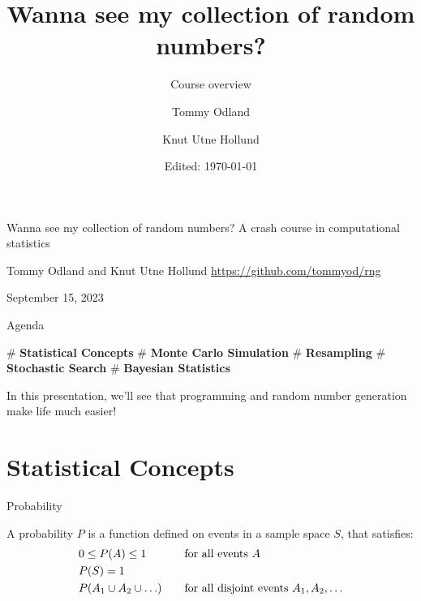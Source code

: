 \documentclass[12pt, aspectratio=149]{beamer}
\institute{Equinor}
\date{Edited: \today}
\author{Tommy Odland \and Knut Utne Hollund}
\title{Wanna see my collection of random numbers?}
\subtitle{Course overview}
\theoremstyle{plain}
\begin{document}
\begin{frame}{}
	\begin{center}
			\vfill
	{\huge Wanna see my collection of random numbers?}
	\vfill
	{\large A crash course in computational statistics}
	\vfill

	\vfill
	{\large  Tommy Odland and Knut Utne Hollund}
	\vfill
	{\small \href{https://github.com/tommyod/rng}{https://github.com/tommyod/rng}}

	\vfill
	September 15, 2023
	\vfill
	\end{center}
\end{frame}


\begin{frame}[fragile]{Agenda}
	
	\begin{easylist}[itemize]
		# \textbf{Statistical Concepts} 
		# \textbf{Monte Carlo Simulation}
		# \textbf{Resampling}
		# \textbf{Stochastic Search} 
		# \textbf{Bayesian Statistics} 
	\end{easylist}
	\hspace{4em}

	In this presentation, we'll see that programming and random number generation make life much easier!
\end{frame}


\section{Statistical Concepts}

\begin{frame}[fragile]{Probability}

	A probability $P$ is a function defined on events in a sample space $S$, that satisfies:
	\begin{align*}
		& 0 \leq P(A) \leq 1  & & \text{for all events $A$} \\
		& P(S) = 1 & & \\
		& P(A_{1} \cup A_{2} \cup \ldots) & \hspace*{1em} & \text{for all disjoint events $A_{1}, A_{2}, \ldots$}	
	\end{align*}  
	
\end{frame}
\end{document}
